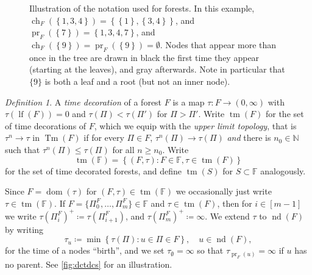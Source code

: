 \documentclass[reqno,draft]{amsart}
\numberwithin{equation}{section}
\theoremstyle{plain}
\theoremstyle{remark}
\newtheorem{definition}[theorem]{Definition}
\newcommand{\N}{\mathbb{N}} %
\DeclareMathOperator{\dom}{dom}
\DeclareMathOperator{\ch}{ch}
\DeclareMathOperator{\pr}{pr}
\newcommand{\fpart}{\Pi} %
\DeclareMathOperator{\lf}{lf}
\DeclareMathOperator{\nd}{nd}
\DeclareMathOperator{\dct}{tm}
\DeclareMathOperator{\tm}{Tm}
\begin{document}
\begin{figure}

    \caption{Illustration of the notation used for forests. In this example, $\ch_F(\left\{ 1,3,4 \right\} ) = \left\{ \left\{ 1 \right\} ,\left\{ 3,4 \right\}  \right\} $, and $\pr_F(\left\{ 7 \right\}) = \left\{ 1,3,4,7 \right\}  $, and $\ch_F(\left\{ 9 \right\} ) = \pr_F(\left\{ 9 \right\} ) = \emptyset $. Nodes that appear more than once in the tree are drawn in black the first time they appear (starting at the leaves), and gray afterwards. Note in particular that $\{9\}$ is both a leaf and a root (but not an inner node). }
        \label{fig:treenotation}
\end{figure}

\begin{definition}\label{def:tau}
    A \emph{time decoration} of a forest $F$ is a map $\tau \colon F \to (0,\infty)$ with $\tau(\lf(F)) = 0$ and $\tau(\fpart) < \tau(\fpart')$ for $\fpart > \fpart'$. Write $\dct(F)$ for the set of time decorations of $F$, which we equip with the \emph{upper limit topology}, that is $\tau^n \to \tau$ in $\tm(F)$ if for every $\fpart \in F$, $\tau^n(\fpart) \to \tau(\fpart)$ \emph{and} there is $n_0\in \N$ such that $\tau^n(\fpart) \le \tau(\fpart)$ for all $n\ge n_0$. Write \[
        \dct(\mathbb{F}) = \left\{ (F,\tau) \colon F\in \mathbb{F}, \tau\in \dct(F) \right\}
    \] for the set of time decorated forests, and define $\dct(S)$ for $S \subset  \mathbb{F}$ analogously.
\end{definition}
Since $F = \dom(\tau)$ for $(F,\tau) \in \dct(\mathbb{F})$ we occasionally just write $\tau \in \dct(\mathbb{F})$.
If $F = \{\fpart_0^F, \ldots ,\fpart_m^F\} \in \mathbb{F}$ and $\tau\in \dct(F)$, then for $i\in [m-1]$ we write $\tau(\fpart_i^F)^+ \coloneqq \tau(\fpart_{i+1}^F)$, and $\tau(\fpart_m^F)^+ \coloneqq \infty $. We extend $\tau$ to $\nd(F)$ by writing 
\begin{equation}\label{eq:tau_u}
    \tau_u \coloneqq \min \left\{ \tau(\fpart)\colon u\in \fpart \in F \right\} ,\quad u\in \nd(F),
\end{equation} for the time of a nodes ``birth'', and we set $\tau_\emptyset = \infty$ so that $\tau_{\pr_F(u)} = \infty$ if $u$ has no parent. See \cref{fig:dctdcs} for an illustration.
\end{document}
